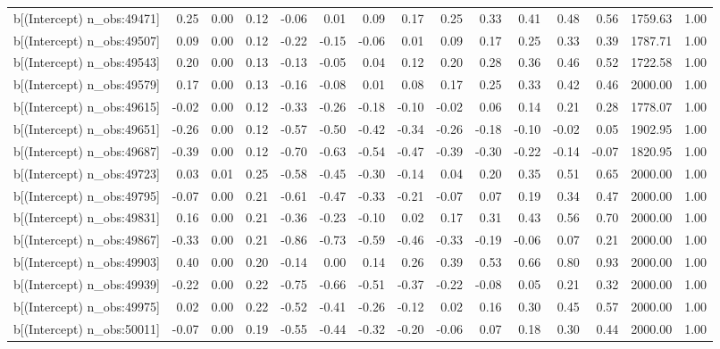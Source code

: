 \begin{table}[ht]
\begin{tabular}{rrrrrrrrrrrrrrr}
  b[(Intercept) n\_obs:49471] & 0.25 & 0.00 & 0.12 & -0.06 & 0.01 & 0.09 & 0.17 & 0.25 & 0.33 & 0.41 & 0.48 & 0.56 & 1759.63 & 1.00 \\ 
  b[(Intercept) n\_obs:49507] & 0.09 & 0.00 & 0.12 & -0.22 & -0.15 & -0.06 & 0.01 & 0.09 & 0.17 & 0.25 & 0.33 & 0.39 & 1787.71 & 1.00 \\ 
  b[(Intercept) n\_obs:49543] & 0.20 & 0.00 & 0.13 & -0.13 & -0.05 & 0.04 & 0.12 & 0.20 & 0.28 & 0.36 & 0.46 & 0.52 & 1722.58 & 1.00 \\ 
  b[(Intercept) n\_obs:49579] & 0.17 & 0.00 & 0.13 & -0.16 & -0.08 & 0.01 & 0.08 & 0.17 & 0.25 & 0.33 & 0.42 & 0.46 & 2000.00 & 1.00 \\ 
  b[(Intercept) n\_obs:49615] & -0.02 & 0.00 & 0.12 & -0.33 & -0.26 & -0.18 & -0.10 & -0.02 & 0.06 & 0.14 & 0.21 & 0.28 & 1778.07 & 1.00 \\ 
  b[(Intercept) n\_obs:49651] & -0.26 & 0.00 & 0.12 & -0.57 & -0.50 & -0.42 & -0.34 & -0.26 & -0.18 & -0.10 & -0.02 & 0.05 & 1902.95 & 1.00 \\ 
  b[(Intercept) n\_obs:49687] & -0.39 & 0.00 & 0.12 & -0.70 & -0.63 & -0.54 & -0.47 & -0.39 & -0.30 & -0.22 & -0.14 & -0.07 & 1820.95 & 1.00 \\ 
  b[(Intercept) n\_obs:49723] & 0.03 & 0.01 & 0.25 & -0.58 & -0.45 & -0.30 & -0.14 & 0.04 & 0.20 & 0.35 & 0.51 & 0.65 & 2000.00 & 1.00 \\ 
  b[(Intercept) n\_obs:49795] & -0.07 & 0.00 & 0.21 & -0.61 & -0.47 & -0.33 & -0.21 & -0.07 & 0.07 & 0.19 & 0.34 & 0.47 & 2000.00 & 1.00 \\ 
  b[(Intercept) n\_obs:49831] & 0.16 & 0.00 & 0.21 & -0.36 & -0.23 & -0.10 & 0.02 & 0.17 & 0.31 & 0.43 & 0.56 & 0.70 & 2000.00 & 1.00 \\ 
  b[(Intercept) n\_obs:49867] & -0.33 & 0.00 & 0.21 & -0.86 & -0.73 & -0.59 & -0.46 & -0.33 & -0.19 & -0.06 & 0.07 & 0.21 & 2000.00 & 1.00 \\ 
  b[(Intercept) n\_obs:49903] & 0.40 & 0.00 & 0.20 & -0.14 & 0.00 & 0.14 & 0.26 & 0.39 & 0.53 & 0.66 & 0.80 & 0.93 & 2000.00 & 1.00 \\ 
  b[(Intercept) n\_obs:49939] & -0.22 & 0.00 & 0.22 & -0.75 & -0.66 & -0.51 & -0.37 & -0.22 & -0.08 & 0.05 & 0.21 & 0.32 & 2000.00 & 1.00 \\ 
  b[(Intercept) n\_obs:49975] & 0.02 & 0.00 & 0.22 & -0.52 & -0.41 & -0.26 & -0.12 & 0.02 & 0.16 & 0.30 & 0.45 & 0.57 & 2000.00 & 1.00 \\ 
  b[(Intercept) n\_obs:50011] & -0.07 & 0.00 & 0.19 & -0.55 & -0.44 & -0.32 & -0.20 & -0.06 & 0.07 & 0.18 & 0.30 & 0.44 & 2000.00 & 1.00 \\ 

\end{tabular}
\end{table}
